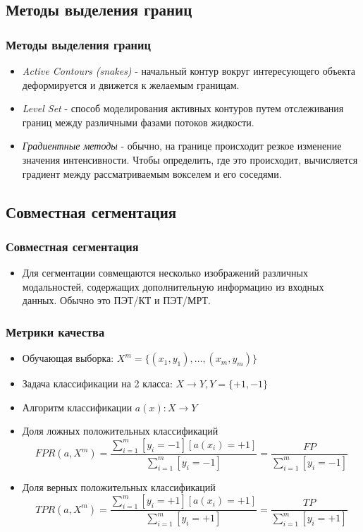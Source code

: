 \subsection{Методы выделения границ}
\begin{frame}
    \frametitle{Методы выделения границ}
    \begin{itemize}
        \item \textit{Active Contours (snakes)} - начальный контур 
        вокруг интересующего объекта деформируется и движется к желаемым границам.
        \item \textit{Level Set} - способ моделирования активных контуров путем отслеживания 
        границ между различными фазами потоков жидкости.
        \item \textit{Градиентные методы} - обычно, на границе происходит резкое изменение значения интенсивности. 
        Чтобы определить, где это происходит, вычисляется градиент между рассматриваемым вокселем и его соседями.
    \end{itemize}
\end{frame}

\subsection{Совместная сегментация}
\begin{frame}
    \frametitle{Совместная сегментация}
    \begin{itemize}
        \item Для сегментации совмещаются несколько изображений различных модальностей, 
        содержащих дополнительную информацию из входных данных. Обычно это ПЭТ/КТ и ПЭТ/МРТ.
    \end{itemize}
\end{frame}

\begin{frame}
    \frametitle{Метрики качества}
    \begin{itemize}
        \item Обучающая выборка: \(X^m=\{(x_1,y_1),\dots ,(x_m, y_m)\}\)
        \item Задача классификации на 2 класса: \(X\rightarrow Y, Y=\{+1, -1\}\)
        \item Алгоритм классификации \(a(x): X\rightarrow Y\)
        \item Доля ложных положительных классификаций
        \[FPR(a, X^m) = \frac{\sum_{i=1}^{m}[y_i=-1][a(x_i)=+1]}{\sum_{i=1}^{m}[y_i=-1]}=\frac{FP}{\sum_{i=1}^{m}[y_i=-1]}\]
        \item Доля верных положительных классификаций
        \[TPR(a, X^m) = \frac{\sum_{i=1}^{m}[y_i=+1][a(x_i)=+1]}{\sum_{i=1}^{m}[y_i=+1]}=\frac{TP}{\sum_{i=1}^{m}[y_i=+1]}\]
    \end{itemize}
\end{frame}

